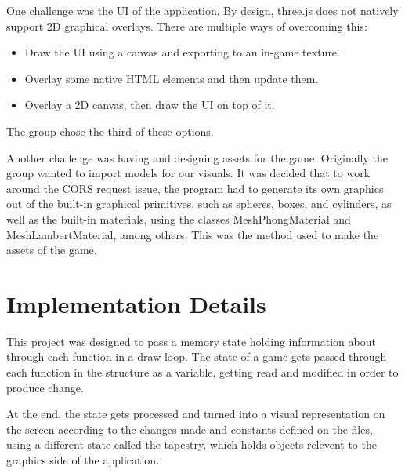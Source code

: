 \documentclass[11pt]{article}
\begin{document}
One challenge was the UI of the application. By design, three.js does not
natively support 2D graphical overlays. There are multiple ways of overcoming
this:
\begin{itemize}
\item Draw the UI using a canvas and exporting to an in-game texture.
\item Overlay some native HTML elements and then update them.
\item Overlay a 2D canvas, then draw the UI on top of it.
\end{itemize}

The group chose the third of these options.

Another challenge was having and designing assets for the game. Originally the
group wanted to import models for our visuals. 
It was decided that to work
around the CORS request issue, the program had to generate its own graphics out
of the built-in graphical primitives, such as spheres, boxes, and cylinders,
as well as the built-in materials, using the classes MeshPhongMaterial and
MeshLambertMaterial, among others. This was the method used to make the assets
of the game.
\section{Implementation Details}
\label{sec:orga95e1da}
This project was designed to pass a memory state holding information about
through each function in a draw
loop. The state of a game gets passed through each function in the structure
as a variable, getting read and modified in order to produce change.

At the end, the state gets processed and turned into a visual representation on
the screen according to the changes made and constants defined on the files,
using a different state called the tapestry, which holds objects relevent to
the graphics side of the application.
\end{document}
